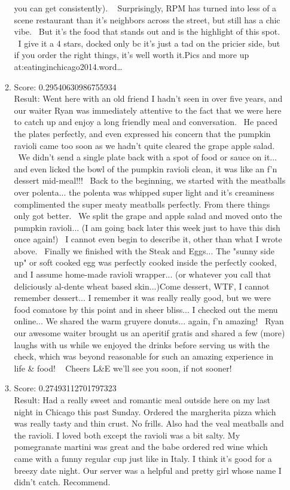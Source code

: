 \documentclass[paper=a4, fontsize=11pt]{jhwhw} %
\begin{document}
\begin{itemize}
\begin{enumerate}
you can get consistently).   Surprisingly, RPM has turned into less of a scene restaurant than it's neighbors across the street, but still has a chic vibe.  But it's the food that stands out and is the highlight of this spot.  I give it a 4 stars, docked only bc it's just a tad on the pricier side, but if you order the right things, it's well worth it.Pics and more up at:eatinginchicago2014.word…
\item Score: 0.29540630986755934\\
Result: Went here with an old friend I hadn't seen in over five years, and our waiter Ryan was immediately attentive to the fact that we were here to catch up and enjoy a long friendly meal and conversation.  He paced the plates perfectly, and even expressed his concern that the pumpkin ravioli came too soon as we hadn't quite cleared the grape apple salad.  We didn't send a single plate back with a spot of food or sauce on it... and even licked the bowl of the pumpkin ravioli clean, it was like an f'n dessert mid-meal!!!  Back to the beginning, we started with the meatballs over polenta... the polenta was whipped super light and it's creaminess complimented the super meaty meatballs perfectly. From there things only got better.  We split the grape and apple salad and moved onto the pumpkin ravioli... (I am going back later this week just to have this dish once again!)  I cannot even begin to describe it, other than what I wrote above.  Finally we finished with the Steak and Eggs... The "sunny side up" or soft cooked egg was perfectly cooked inside the perfectly cooked, and I assume home-made ravioli wrapper... (or whatever you call that deliciously al-dente wheat based skin...)Come dessert, WTF, I cannot remember dessert... I remember it was really really good, but we were food comatose by this point and in sheer bliss... I checked out the menu online... We shared the warm gruyere donuts... again, f'n amazing!  Ryan our awesome waiter brought us an aperitif gratis and shared a few (more) laughs with us while we enjoyed the drinks before serving us with the check, which was beyond reasonable for such an amazing experience in life \& food!   Cheers L\&E we'll see you soon, if not sooner!
\item Score: 0.27493112701797323\\
Result: Had a really sweet and romantic meal outside here on my last night in Chicago this past Sunday. Ordered the margherita pizza which was really tasty and thin crust. No frills. Also had the veal meatballs and the ravioli. I loved both except the ravioli was a bit salty. My pomegranate martini was great and the babe ordered red wine which came with a funny regular cup just like in Italy. I think it's good for a breezy date night. Our server was a helpful and pretty girl whose name I didn't catch. Recommend.

\end{enumerate}
\end{itemize}
\end{document}
